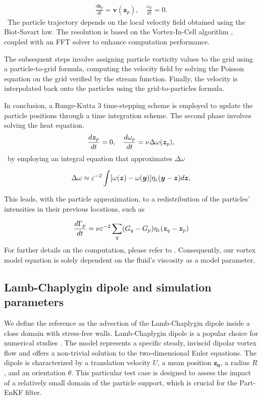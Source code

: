 \begin{eqnarray*}
	\frac{d\bm z_p}{dt} = \bm{v}(\bm z_p), \quad \frac{\omega_p}{dt} = 0.
\end{eqnarray*}~The particle trajectory depends on the local velocity field obtained using the Biot-Savart law. The resolution is based on the Vortex-In-Cell algorithm \cite{christiansen_1973, birdsall_1969}, coupled with an FFT solver to enhance computation performance.

The subsequent steps involve assigning particle vorticity values to the grid using a particle-to-grid formula, computing the velocity field by solving the Poisson equation on the grid verified by the stream function. Finally, the velocity is interpolated back onto the particles using the grid-to-particles formula.

In conclusion, a Runge-Kutta 3 time-stepping scheme is employed to update the particle positions through a time integration scheme. The second phase involves solving the heat equation.
\begin{equation*}
	\frac{d\bm{z}_p}{dt} = 0, \quad	\frac{d\omega_p}{dt} = \nu \Delta \omega(\bm{z}_p),
\end{equation*}~by employing an integral equation that approximates $\Delta \omega$

\begin{equation*}
	\Delta \omega \approx \varepsilon^{-2} \int [\omega(\bm{z})  - \omega(\bm{y})] \eta_\varepsilon(\bm{y} - \bm{z}) d\bm{z},
\end{equation*}

This leads, with the particle approximation, to a redistribution of the particles' intensities in their previous locations, such as

\begin{equation*}
	\frac{d\Gamma_p}{dt} = \nu \varepsilon^{-2} \sum_q (G_q - G_p) \eta_\varepsilon(\bm{z}_q - \bm{z}_p)
\end{equation*}
For further details on the computation, please refer to \cite{cottet_1990}. Consequently, our vortex model equation is solely dependent on the fluid's viscosity as a model parameter.


\subsection{Lamb-Chaplygin dipole and simulation parameters}

We define the reference as the advection of the Lamb-Chaplygin dipole inside a close domain with stress-free walls. Lamb-Chaplygin dipole is a popular choice for numerical studies \cite{orlandi_vortex_1990}. The model represents a specific steady, inviscid dipolar vortex flow and offers a non-trivial solution to the two-dimensional Euler equations. The dipole is characterized by a translation velocity $U$, a mean position $\bm{z_0}$, a radius $R$, and an orientation $\theta$. This particular test case is designed to assess the impact of a relatively small domain of the particle support, which is crucial for the Part-EnKF filter.

